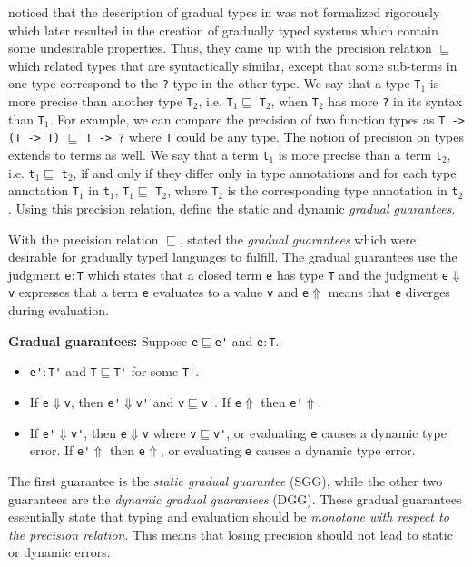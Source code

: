 \documentclass{article}
\theoremstyle{definition}
\begin{document}
\citet{siek_refined_2015} noticed that the description of gradual types in
\citet{siek_gradual_2006} was not formalized rigorously which later resulted in
the creation of gradually typed systems which contain some undesirable
properties. Thus, they came up with the precision relation \(\sqsubseteq\) which
related types that are syntactically similar, except that some sub-terms in one
type correspond to the \verb|?| type in the other type. We say that a type
\verb|T|\(_1\) is more precise than another type \verb|T|\(_2\), i.e.
\verb|T|\(_1 \sqsubseteq\) \verb|T|\(_2\), when \verb|T|\(_2\) has more \verb|?|
in its syntax than \verb|T|\(_1\). For example, we can compare the precision of
two function types as \verb|T -> (T -> T)| \(\sqsubseteq\) \verb|T -> ?| where
\verb|T| could be any type. The notion of precision on types extends to terms as
well. We say that a term \verb|t|\(_1\) is more precise than a term
\verb|t|\(_2\), i.e. \verb|t|\(_1 \sqsubseteq\) \verb|t|\(_2\), if and only if
they differ only in type annotations and for each type annotation \verb|T|\(_1\)
in \verb|t|\(_1\), \verb|T|\(_1 \sqsubseteq\) \verb|T|\(_2\), where
\verb|T|\(_2\) is the corresponding type annotation in \verb|t|\(_2\) . Using
this precision relation, \citet{siek_refined_2015} define the static and dynamic
\textit{gradual guarantees}.

With the precision relation \(\sqsubseteq\), \citet{siek_refined_2015} stated
the \textit{gradual guarantees} which were desirable for gradually typed
languages to fulfill. The gradual guarantees use the judgment
\verb|e|\(:\)\verb|T| which states that a closed term \verb|e| has type \verb|T|
and the judgment \verb|e|\(\Downarrow\)\verb|v| expresses that a term \verb|e|
evaluates to a value \verb|v| and \verb|e|\(\Uparrow\) means that \verb|e|
diverges during evaluation.

\textbf{Gradual guarantees: } Suppose \verb|e|\(\sqsubseteq\)\verb|e'| and
\verb|e|\(:\)\verb|T|.
  \begin{itemize}
  \item \verb|e'|\(:\)\verb|T'| and
    \verb|T|\(\sqsubseteq\)\verb|T'| for some \verb|T'|.
  \item If \verb|e|\(\Downarrow\)\verb|v|, then \verb|e'|\(\Downarrow\)\verb|v'|
    and \verb|v|\(\sqsubseteq\)\verb|v'|. If \verb|e|\(\Uparrow\) then
    \verb|e'|\(\Uparrow\).
  \item If \verb|e'|\(\Downarrow\)\verb|v'|, then \verb|e|\(\Downarrow\)\verb|v|
    where \verb|v|\(\sqsubseteq\)\verb|v'|, or evaluating \verb|e| causes a
    dynamic type error. If \verb|e'|\(\Uparrow\) then \verb|e|\(\Uparrow\), or
    evaluating \verb|e| causes a dynamic type error.
  \end{itemize}
 The first guarantee is the \textit{static gradual guarantee} (SGG), while the
 other two guarantees are the \textit{dynamic gradual guarantees} (DGG). These
 gradual guarantees essentially state that typing and evaluation should be
 \textit{monotone with respect to the precision relation}. This means that
 losing precision should not lead to static or dynamic errors.
\end{document}
